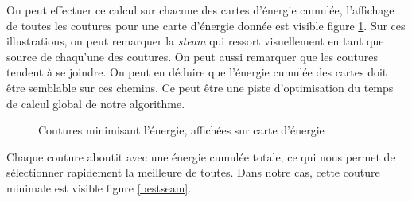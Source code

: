 \documentclass[a4paper]{article}
\begin{document}
On peut effectuer ce calcul sur chacune des cartes d'énergie cumulée, l'affichage de toutes les coutures pour
une carte d'énergie donnée est visible figure \ref{allseams}. Sur ces illustrations, on peut remarquer la
{\em steam} qui ressort visuellement en tant que source de chaqu'une des coutures.
On peut aussi remarquer que les coutures tendent à se joindre. On peut en déduire que l'énergie
cumulée des cartes doit être semblable sur ces chemins. Ce peut être une piste d'optimisation du temps de
calcul global de notre algorithme.

\begin{figure}[!ht]%
    \centering
    \hspace{0.030\textwidth}
    \caption{Coutures minimisant l'énergie, affichées sur carte d'énergie}
    \label{allseams}
\end{figure}

Chaque couture aboutit avec une énergie cumulée totale, ce qui nous permet de sélectionner rapidement la
meilleure de toutes. Dans notre cas, cette couture minimale est visible figure \ref{bestseam}.
\end{document}
